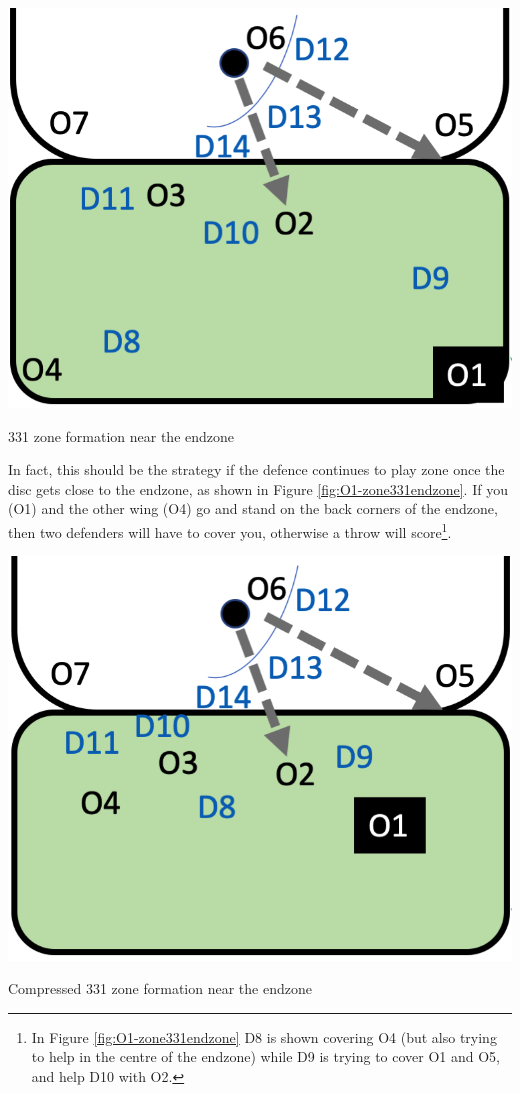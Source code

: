 \documentclass{tufte-handout}
\begin{document}
\begin{marginfigure}%
  \includegraphics[width=\linewidth]{O1-zone331endzone}
  \caption{331 zone formation near the endzone}
  \label{fig:O1-zone331endzone}
\end{marginfigure}

In fact,
this should be the strategy 
if the defence 
continues to play zone 
once the disc 
gets close to the endzone, 
as shown in Figure \ref{fig:O1-zone331endzone}.
If you (O1) 
and the other wing (O4) 
go and stand 
on the back corners 
of the endzone, 
then two defenders will 
have to cover you, 
otherwise a throw 
will score\footnote{
In Figure \ref{fig:O1-zone331endzone}
D8 is shown covering O4 
(but also trying to help in the centre of the endzone)
while D9 is trying to cover O1 and O5,
and help D10 with O2.}.

\begin{marginfigure}%
  \includegraphics[width=\linewidth]{O1-zone331endzone2}
  \caption{Compressed 331 zone formation near the endzone}
  \label{fig:O1-zone331endzone2}
\end{marginfigure}
\end{document}
